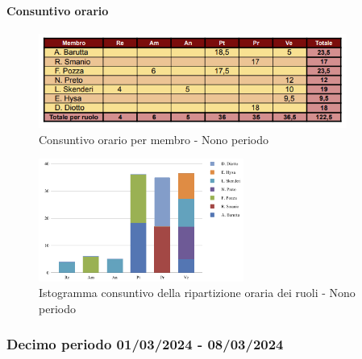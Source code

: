 \paragraph{Consuntivo orario}

\begin{figure}[H]
    \centering
    \includegraphics[width=0.9\textwidth]{../Images/tabCons9.png}
    \caption{Consuntivo orario per membro - Nono periodo}
    \label{fig:Constuntivo_orario_9}
\end{figure}

\begin{figure}[H]
    \centering
    \includegraphics[width=0.6\textwidth]{../Images/graficoConsPrev9.png}
    \caption{Istogramma consuntivo della ripartizione oraria dei ruoli - Nono periodo}
    \label{fig:Consuntivo_ripartizione_oraria_9}
\end{figure}


\subsubsection{Decimo periodo  01/03/2024 - 08/03/2024}

